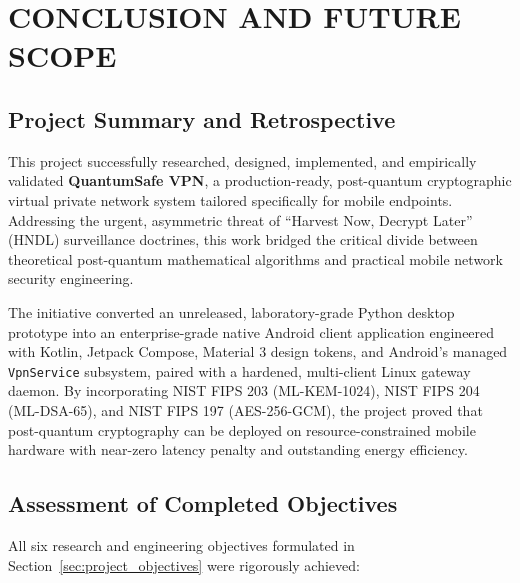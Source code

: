 
\chapter{CONCLUSION AND FUTURE SCOPE}
\label{chap:conclusion}

\section{Project Summary and Retrospective}
\label{sec:project_summary}

This project successfully researched, designed, implemented, and empirically validated \textbf{QuantumSafe VPN}, a production-ready, post-quantum cryptographic virtual private network system tailored specifically for mobile endpoints. Addressing the urgent, asymmetric threat of ``Harvest Now, Decrypt Later'' (HNDL) surveillance doctrines, this work bridged the critical divide between theoretical post-quantum mathematical algorithms and practical mobile network security engineering.

The initiative converted an unreleased, laboratory-grade Python desktop prototype into an enterprise-grade native Android client application engineered with Kotlin, Jetpack Compose, Material 3 design tokens, and Android's managed \texttt{VpnService} subsystem, paired with a hardened, multi-client Linux gateway daemon. By incorporating NIST FIPS 203 (ML-KEM-1024), NIST FIPS 204 (ML-DSA-65), and NIST FIPS 197 (AES-256-GCM), the project proved that post-quantum cryptography can be deployed on resource-constrained mobile hardware with near-zero latency penalty and outstanding energy efficiency.

\section{Assessment of Completed Objectives}
\label{sec:objectives_assessment}

All six research and engineering objectives formulated in Section~\ref{sec:project_objectives} were rigorously achieved:

